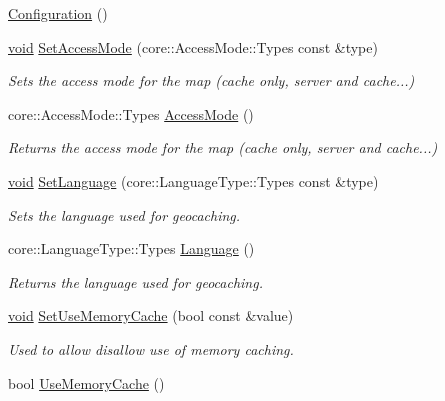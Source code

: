 \begin{DoxyCompactItemize}
\item 
\hyperlink{group___o_p_map_widget_ga0963ae98b690172299a36a61ee003c21}{\-Configuration} ()
\item 
\hyperlink{group___u_a_v_objects_plugin_ga444cf2ff3f0ecbe028adce838d373f5c}{void} \hyperlink{group___o_p_map_widget_ga41001a3e8948832246f19baf28c45e68}{\-Set\-Access\-Mode} (core\-::\-Access\-Mode\-::\-Types const \&type)
\begin{DoxyCompactList}\small\item\em \-Sets the access mode for the map (cache only, server and cache...) \end{DoxyCompactList}\item 
core\-::\-Access\-Mode\-::\-Types \hyperlink{group___o_p_map_widget_ga902ee11abd0b7c7634bfbadf5bd73517}{\-Access\-Mode} ()
\begin{DoxyCompactList}\small\item\em \-Returns the access mode for the map (cache only, server and cache...) \end{DoxyCompactList}\item 
\hyperlink{group___u_a_v_objects_plugin_ga444cf2ff3f0ecbe028adce838d373f5c}{void} \hyperlink{group___o_p_map_widget_ga29b42ec96098c35b537e64d33d6c41b5}{\-Set\-Language} (core\-::\-Language\-Type\-::\-Types const \&type)
\begin{DoxyCompactList}\small\item\em \-Sets the language used for geocaching. \end{DoxyCompactList}\item 
core\-::\-Language\-Type\-::\-Types \hyperlink{group___o_p_map_widget_ga0058ff0ad6bf530d4e7ce0399a14a39c}{\-Language} ()
\begin{DoxyCompactList}\small\item\em \-Returns the language used for geocaching. \end{DoxyCompactList}\item 
\hyperlink{group___u_a_v_objects_plugin_ga444cf2ff3f0ecbe028adce838d373f5c}{void} \hyperlink{group___o_p_map_widget_ga323ea9b6071044204ce278734ef855fb}{\-Set\-Use\-Memory\-Cache} (bool const \&value)
\begin{DoxyCompactList}\small\item\em \-Used to allow disallow use of memory caching. \end{DoxyCompactList}\item 
bool \hyperlink{group___o_p_map_widget_ga07a1c9decb34a05e0337db285bb15bc3}{\-Use\-Memory\-Cache} ()

\end{DoxyCompactItemize}

